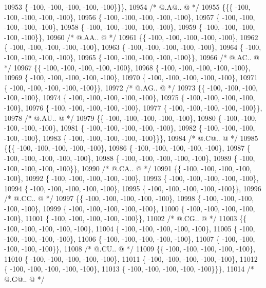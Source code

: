 \begin{DoxyCode}
10953 \{ -100, -100, -100, -100, -100\}\}\},
10954 \textcolor{comment}{/*  @.A@.. @ */}
10955 \{\{\{ -100, -100, -100, -100, -100\},
10956 \{ -100, -100, -100, -100, -100\},
10957 \{ -100, -100, -100, -100, -100\},
10958 \{ -100, -100, -100, -100, -100\},
10959 \{ -100, -100, -100, -100, -100\}\},
10960 \textcolor{comment}{/*  @.AA.. @ */}
10961 \{\{ -100, -100, -100, -100, -100\},
10962 \{ -100, -100, -100, -100, -100\},
10963 \{ -100, -100, -100, -100, -100\},
10964 \{ -100, -100, -100, -100, -100\},
10965 \{ -100, -100, -100, -100, -100\}\},
10966 \textcolor{comment}{/*  @.AC.. @ */}
10967 \{\{ -100, -100, -100, -100, -100\},
10968 \{ -100, -100, -100, -100, -100\},
10969 \{ -100, -100, -100, -100, -100\},
10970 \{ -100, -100, -100, -100, -100\},
10971 \{ -100, -100, -100, -100, -100\}\},
10972 \textcolor{comment}{/*  @.AG.. @ */}
10973 \{\{ -100, -100, -100, -100, -100\},
10974 \{ -100, -100, -100, -100, -100\},
10975 \{ -100, -100, -100, -100, -100\},
10976 \{ -100, -100, -100, -100, -100\},
10977 \{ -100, -100, -100, -100, -100\}\},
10978 \textcolor{comment}{/*  @.AU.. @ */}
10979 \{\{ -100, -100, -100, -100, -100\},
10980 \{ -100, -100, -100, -100, -100\},
10981 \{ -100, -100, -100, -100, -100\},
10982 \{ -100, -100, -100, -100, -100\},
10983 \{ -100, -100, -100, -100, -100\}\}\},
10984 \textcolor{comment}{/*  @.C@.. @ */}
10985 \{\{\{ -100, -100, -100, -100, -100\},
10986 \{ -100, -100, -100, -100, -100\},
10987 \{ -100, -100, -100, -100, -100\},
10988 \{ -100, -100, -100, -100, -100\},
10989 \{ -100, -100, -100, -100, -100\}\},
10990 \textcolor{comment}{/*  @.CA.. @ */}
10991 \{\{ -100, -100, -100, -100, -100\},
10992 \{ -100, -100, -100, -100, -100\},
10993 \{ -100, -100, -100, -100, -100\},
10994 \{ -100, -100, -100, -100, -100\},
10995 \{ -100, -100, -100, -100, -100\}\},
10996 \textcolor{comment}{/*  @.CC.. @ */}
10997 \{\{ -100, -100, -100, -100, -100\},
10998 \{ -100, -100, -100, -100, -100\},
10999 \{ -100, -100, -100, -100, -100\},
11000 \{ -100, -100, -100, -100, -100\},
11001 \{ -100, -100, -100, -100, -100\}\},
11002 \textcolor{comment}{/*  @.CG.. @ */}
11003 \{\{ -100, -100, -100, -100, -100\},
11004 \{ -100, -100, -100, -100, -100\},
11005 \{ -100, -100, -100, -100, -100\},
11006 \{ -100, -100, -100, -100, -100\},
11007 \{ -100, -100, -100, -100, -100\}\},
11008 \textcolor{comment}{/*  @.CU.. @ */}
11009 \{\{ -100, -100, -100, -100, -100\},
11010 \{ -100, -100, -100, -100, -100\},
11011 \{ -100, -100, -100, -100, -100\},
11012 \{ -100, -100, -100, -100, -100\},
11013 \{ -100, -100, -100, -100, -100\}\}\},
11014 \textcolor{comment}{/*  @.G@.. @ */}

\end{DoxyCode}
